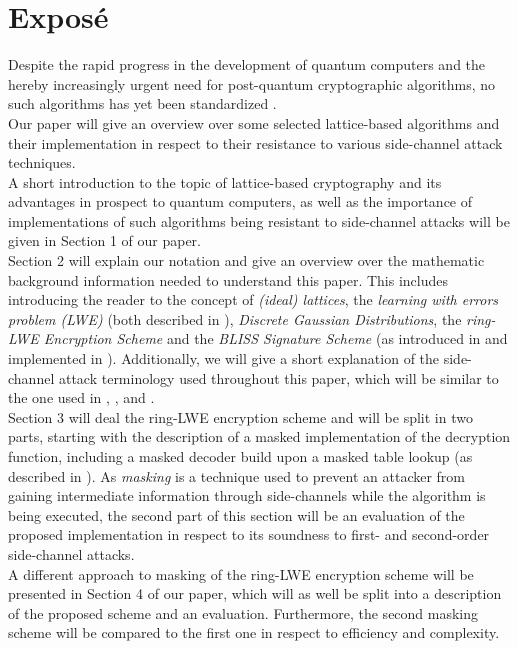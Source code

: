 %
%

\chapter{Expos\'{e}}
Despite the rapid progress in the development of quantum computers and the hereby increasingly urgent need for post-quantum cryptographic algorithms, no such algorithms has yet been standardized \cite{Nist}.\\
Our paper will give an overview over some selected lattice-based algorithms and their implementation in respect to their resistance to various side-channel attack techniques.\\
A short introduction to the topic of lattice-based cryptography and its advantages in prospect to quantum computers, %
as well as the importance of implementations of such algorithms being resistant to side-channel attacks will be given in Section 1 of our paper.\\ 
Section 2 will explain our notation and give an overview over the mathematic background information needed to understand this paper. This includes introducing the reader to the concept of \textit{(ideal) lattices}, the \textit{learning with errors problem (LWE)} (both described in \cite{cryptoeprint:2012:230}), \textit{Discrete Gaussian Distributions}, the \textit{ring-LWE Encryption Scheme} and the \textit{BLISS Signature Scheme} (as introduced in \cite{cryptoeprint:2013:383} and implemented in \cite{Pöppelmann2014}). Additionally, we will give a short explanation of the side-channel attack terminology used throughout this paper, which will be similar to the one used in \cite{DBLP:conf/crypto/KocherJJ99}, \cite{Kocher2011}, \cite{cryptoeprint:2010:646} and \cite{cryptoeprint:2010:385}.\\ 
Section 3 will deal the ring-LWE encryption scheme and will be split in two parts, starting with the description of a masked implementation of the decryption function, including a masked decoder build upon a masked table lookup (as described in \cite{maskedRing}). As \textit{masking} is a technique used to prevent an attacker from gaining intermediate information through side-channels while the algorithm is being executed, the second part of this section will be an evaluation of the proposed implementation in respect to its soundness to first- and second-order side-channel attacks.\\ 
A different approach to masking of the ring-LWE encryption scheme \cite{Reparaz2016} will be presented in Section 4 of our paper, which will as well be split into a description of the proposed scheme and an evaluation. Furthermore, the second masking scheme will be compared to the first one in respect to efficiency and complexity.\\

